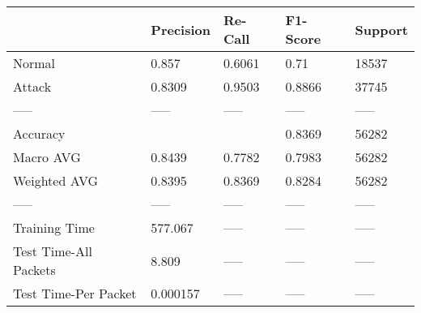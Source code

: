 \begin{tabular}{lllll}
\toprule
{} & Precision & Re-Call & F1-Score & Support \\
\midrule
Normal                &     0.857 &  0.6061 &     0.71 &   18537 \\
Attack                &    0.8309 &  0.9503 &   0.8866 &   37745 \\
-----                 &     ----- &   ----- &    ----- &   ----- \\
Accuracy              &           &         &   0.8369 &   56282 \\
Macro AVG             &    0.8439 &  0.7782 &   0.7983 &   56282 \\
Weighted AVG          &    0.8395 &  0.8369 &   0.8284 &   56282 \\
-----                 &     ----- &   ----- &    ----- &   ----- \\
Training Time         &   577.067 &   ----- &    ----- &   ----- \\
Test Time-All Packets &     8.809 &   ----- &    ----- &   ----- \\
Test Time-Per Packet  &  0.000157 &   ----- &    ----- &   ----- \\
\bottomrule
\end{tabular}

